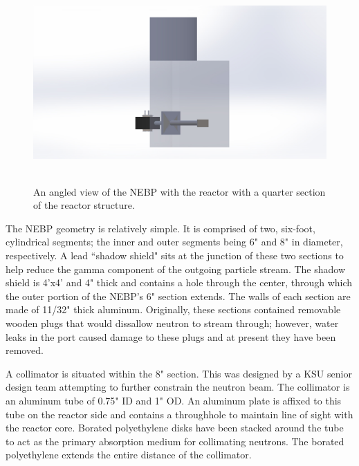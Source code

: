 \begin{figure}[htb]
\centering
\includegraphics[height=3in]{tex/figures/solidworksangled.jpg}
\caption[Solidworks Angled NEBP]{An angled view of the NEBP with the reactor with a quarter section of the reactor structure.}
\label{fig:solidworksangled}
\end{figure}


The NEBP geometry is relatively simple.
It is comprised of two, six-foot, cylindrical segments; the inner and outer segments being 6" and 8" in diameter, respectively.
A lead ``shadow shield" sits at the junction of these two sections to help reduce the gamma component of the outgoing particle stream.
The shadow shield is 4'x4' and 4" thick and contains a hole through the center, through which the outer portion of the NEBP's 6" section extends.
The walls of each section are made of 11/32" thick aluminum.
Originally, these sections contained removable wooden plugs that would dissallow neutron to stream through; however, water leaks in the port caused damage to these plugs and at present they have been removed.

A collimator is situated within the 8" section.
This was designed by a KSU senior design team attempting to further constrain the neutron beam.
The collimator is an aluminum tube of 0.75" ID and 1" OD.
An aluminum plate is affixed to this tube on the reactor side and contains a throughhole to maintain line of sight with the reactor core.
Borated polyethylene disks have been stacked around the tube to act as the primary absorption medium for collimating neutrons.
The borated polyethylene extends the entire distance of the collimator. 


